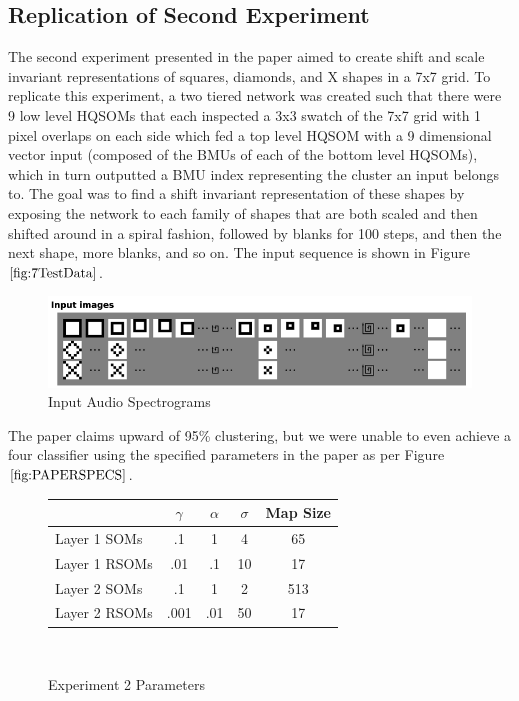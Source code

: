 \documentclass[a4paper,10pt]{article}
\begin{document}
\subsection{Replication of Second Experiment}
The second experiment presented in the paper aimed to create shift and scale invariant
representations of squares, diamonds, and X shapes in a 7x7 grid.  To replicate this experiment, a
two tiered network was created such that there were 9 low level HQSOMs that each inspected a 3x3
swatch of the 7x7 grid with 1 pixel overlaps on each side which fed a top level HQSOM with a 9
dimensional vector input (composed of the BMUs of each of the bottom level HQSOMs), which in turn
outputted a BMU index representing the cluster an input belongs to. The goal was to find a shift
invariant representation of these shapes by exposing the network to each family of shapes that
are both scaled and then shifted around in a spiral fashion, followed by blanks for 100 steps,
and then the next shape, more blanks, and so on.  The input sequence is shown in Figure
$\ref{fig:7TestData}$.
\begin{figure}[ht]
\begin{center}
 \includegraphics[scale=.3]{./exp2_dataset.png}
\end{center}
\caption{Input Audio Spectrograms}
\label{fig:7TestData}
\end{figure} 

The paper claims upward of 95\% clustering, but we were unable to even achieve a four
classifier using the specified parameters in the paper as per Figure $\ref{fig:PAPERSPECS}$. 
\begin{figure}[ht] 
 \begin{center}
  \begin{tabular}{ | l | c | c | c | c | }
    \hline
    & $\gamma$ & $\alpha$ & $\sigma$ & Map Size\\ \hline
    Layer 1 SOMs  & .1   & 1   & 4  & 65\\ \hline
    Layer 1 RSOMs & .01  & .1  & 10 & 17\\ \hline
    Layer 2 SOMs  & .1   & 1   & 2  & 513\\ \hline
    Layer 2 RSOMs &  .001 & .01 & 50 & 17 \\
    \hline
  \end{tabular}
\caption{Experiment 2 Parameters}
\label{fig:PAPERSPECS}
\end{center}
\
\end{figure}
\end{document}
